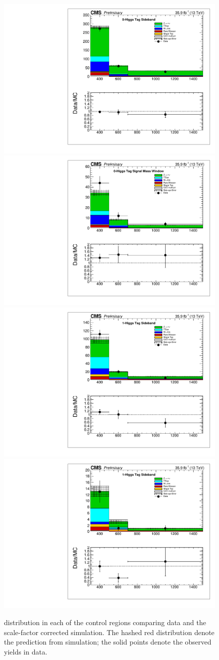 \begin{figure}[hbp!]
\centering
\includegraphics[trim={5px 5px 5px 5px},clip,width=0.45\linewidth]{figs/Unblinding_antitagSB.pdf}
\includegraphics[trim={5px 5px 5px 5px},clip,width=0.45\linewidth]{figs/Unblinding_antitagSR.pdf}\\
\includegraphics[trim={5px 5px 5px 5px},clip,width=0.45\linewidth]{figs/Unblinding_tagSB.pdf}
\includegraphics[trim={5px 5px 5px 5px},clip,width=0.45\linewidth]{figs/Unblinding_doubletagSB.pdf}\\
\caption{\ptmiss distribution in each of the control regions comparing data and the scale-factor corrected simulation.  The hashed red distribution denote the prediction from simulation; the solid points denote the observed yields in data.}
\label{fig:UnblindCR}
\end{figure}

